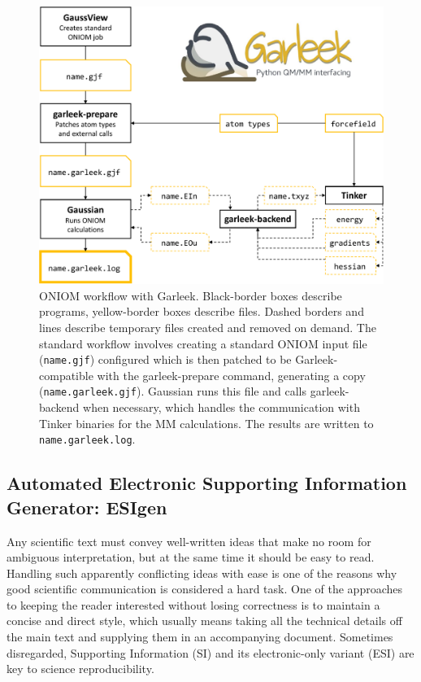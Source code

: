 \begin{figure}[H] %
	\includegraphics[width=\textwidth]{./figures/05/garleek-crop.pdf}
	\cprotect\caption[ONIOM workflow with Garleek]{ONIOM workflow with Garleek. Black-border boxes describe programs, yellow-border boxes describe files. Dashed borders and lines describe temporary files created and removed on demand. The standard workflow involves creating a standard ONIOM input file (\texttt{name.gjf}) configured which is then patched to be Garleek-compatible with the garleek-prepare command, generating a copy (\texttt{name.garleek.gjf}). Gaussian runs this file and calls garleek-backend when necessary, which handles the communication with Tinker binaries for the MM calculations. The results are written to \texttt{name.garleek.log}.}
	\label{fig:garleek}
\end{figure}


\subsection{Automated Electronic Supporting Information Generator: ESIgen}


Any scientific text must convey well-written ideas that make no room for ambiguous interpretation, but at the same time it should be easy to read. Handling such apparently conflicting ideas with ease is one of the reasons why good scientific communication is considered a hard task. One of the approaches to keeping the reader interested without losing correctness is to maintain a concise and direct style, which usually means taking all the technical details off the main text and supplying them in an accompanying document. Sometimes disregarded, Supporting Information (SI) and its electronic-only variant (ESI) are key to science reproducibility.

